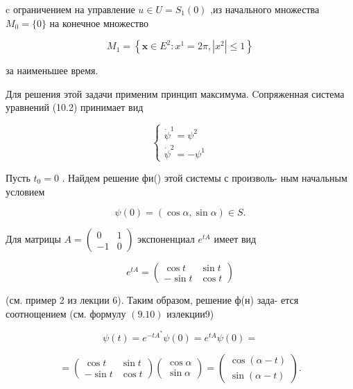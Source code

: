 \documentclass[8pt]{extarticle}
\begin{document}
c ограничением на управление \(u \in  U = {S}_{1}\left( 0\right)\) ,из начального множества \({M}_{0} = \{ 0\}\) на конечное множество

\[
{M}_{1} = \left\{  {\mathbf{x} \in  {E}^{2} : {x}^{1} = {2\pi },\left| {x}^{2}\right|  \leq  1}\right\} \tag{10.14}
\]

за наименьшее время.

Для решения этой задачи применим принцип максимума. Cопряженная система уравнений (10.2) принимает вид

\[
\left\{  \begin{array}{l} {\dot{\psi }}^{1} = {\psi }^{2} \\  {\dot{\psi }}^{2} =  - {\psi }^{1} \end{array}\right.
\]

Пусть \({t}_{0} = 0\) . Найдем решение фи() этой системы с произволь- ным начальным условием

\[
\psi \left( 0\right)  = \left( {\cos \alpha ,\sin \alpha }\right)  \in  S. \tag{10.15}
\]

Для матрицы \(A = \left( \begin{array}{cc} 0 & 1 \\   - 1 & 0 \end{array}\right)\) экспоненциал \({e}^{tA}\) имеет вид

\[
{e}^{tA} = \left( \begin{array}{cc} \cos t & \sin t \\   - \sin t & \cos t \end{array}\right) \tag{10.16}
\]

(см. пример 2 из лекции 6). Таким образом, решение ф(н) зада- ется соотнощением (см. формулу \(\left( {9.10}\right)\) излекции9)

\[
\psi \left( t\right)  = {e}^{-t{A}^{ * }}\psi \left( 0\right)  = {e}^{tA}\psi \left( 0\right)  =
\]

\[
= \left( \begin{array}{cc} \cos t & \sin t \\   - \sin t & \cos t \end{array}\right) \left( \begin{array}{c} \cos \alpha \\  \sin \alpha \end{array}\right)  = \left( \begin{array}{c} \cos \left( {\alpha  - t}\right) \\  \sin \left( {\alpha  - t}\right) \end{array}\right) . \tag{10.17}
\]
\end{document}
